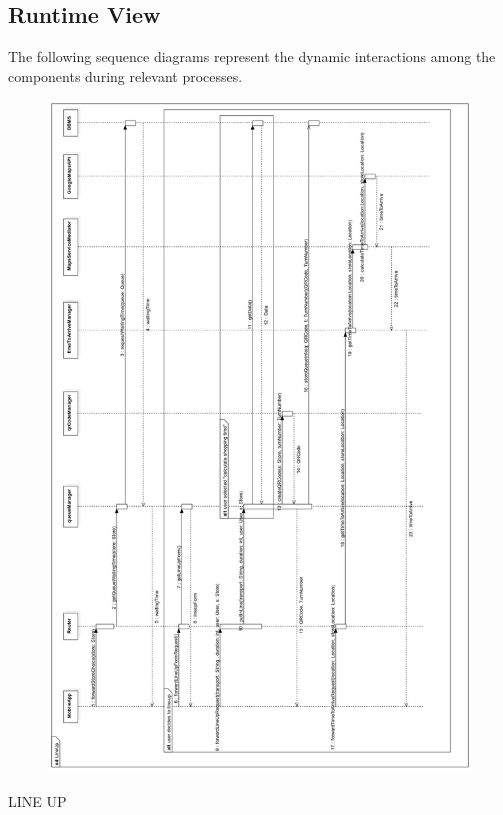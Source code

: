 \documentclass{article}
\begin{document}
\subsection{Runtime View}
The following sequence diagrams represent the dynamic interactions among the components during relevant processes.\\
\begin{figure}[H]
  \includegraphics[width=\linewidth]{LineUpRT.png}
  
\end{figure}
LINE UP\\
\end{document}
